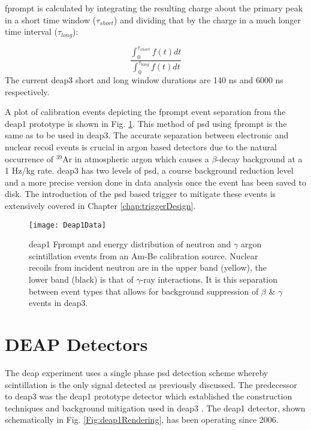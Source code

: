 \gls{fprompt} is calculated by integrating the resulting charge about the primary peak in a short time window ($\tau_{short}$) and dividing that by the charge in a much longer time interval ($\tau_{long}$):

\begin{equation}
\frac{\int_{0}^{\tau_{short}} f(t) dt}{\int_{0}^{\tau_{long}} f(t) dt}
\label{Eq:fpromptDefinition}
\end{equation}
The current \gls{deap3} short and long window durations are 140 ns and 6000 ns respectively.

A plot of calibration events depicting the \gls{fprompt} event separation from the \gls{deap1} prototype is shown in Fig. \ref{Fig:deap1Fprompt}. This method of \gls{psd} using \gls{fprompt} is the same as to be used in \gls{deap3}. The accurate separation between electronic and nuclear recoil events is crucial in argon based detectors due to the natural occurrence of $^{39}$Ar in atmospheric argon which causes a $\beta$-decay background at a 1 Hz/kg rate. \gls{deap3} has two levels of \gls{psd}, a course background reduction level and a more precise version done in data analysis once the event has been saved to disk. The introduction of the \gls{psd} based trigger to mitigate these events is extensively covered in Chapter \ref{chap:triggerDesign}.

\begin{figure}[ht]
\centering
\texttt{[image: Deap1Data]}
\caption{\gls{deap1} Fprompt and energy distribution of neutron and $\gamma$ argon scintillation events from an Am-Be calibration source. Nuclear recoils from incident neutron are in the upper band (yellow), the lower band (black) is that of $\gamma$-ray interactions. It is this separation between event types that allows for background suppression of $\beta$ $\&$ $\gamma$ events in \gls{deap3}.}
\label{Fig:deap1Fprompt}
\end{figure}


\section{DEAP Detectors}
The \gls{deap} experiment uses a single phase \gls{psd} detection scheme whereby scintillation is the only signal detected as previously discussed. The predecessor to \gls{deap3} was the \gls{deap1} prototype detector which established the construction techniques and background mitigation used in \gls{deap3} \cite{tinaPollmann}. The \gls{deap1} detector, shown schematically in Fig. \ref{Fig:deap1Rendering}, has been operating since 2006.

